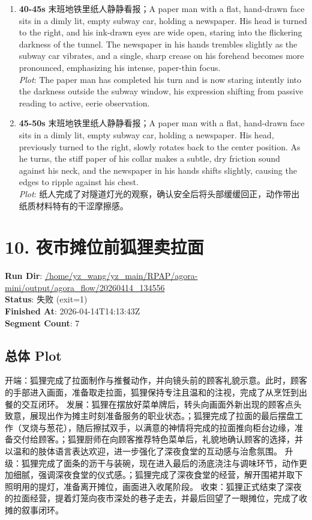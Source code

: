 \documentclass[11pt,a4paper]{article}
\begin{document}
\begin{enumerate}
\item \textbf{40-45s} 末班地铁里纸人静静看报；A paper man with a flat, hand-drawn face sits in a dimly lit, empty subway car, holding a newspaper. His head is turned to the right, and his ink-drawn eyes are wide open, staring into the flickering darkness of the tunnel. The newspaper in his hands trembles slightly as the subway car vibrates, and a single, sharp crease on his forehead becomes more pronounced, emphasizing his intense, paper-thin focus.\\\newline \textit{Plot}: The paper man has completed his turn and is now staring intently into the darkness outside the subway window, his expression shifting from passive reading to active, eerie observation.
\item \textbf{45-50s} 末班地铁里纸人静静看报；A paper man with a flat, hand-drawn face sits in a dimly lit, empty subway car, holding a newspaper. His head, previously turned to the right, slowly rotates back to the center position. As he turns, the stiff paper of his collar makes a subtle, dry friction sound against his neck, and the newspaper in his hands shifts slightly, causing the edges to ripple against his chest.\\\newline \textit{Plot}: 纸人完成了对隧道灯光的观察，确认安全后将头部缓缓回正，动作带出纸质材料特有的干涩摩擦感。
\end{enumerate}

\section{10. 夜市摊位前狐狸卖拉面}
\textbf{Run Dir}: \url{/home/yz\_wang/yz\_main/RPAP/agora-mini/output/agora\_flow/20260414\_134556}\\
\textbf{Status}: 失败 (exit=1)\\
\textbf{Finished At}: 2026-04-14T14:13:43Z\\
\textbf{Segment Count}: 7

\subsection*{总体 Plot}
开端：狐狸完成了拉面制作与推餐动作，并向镜头前的顾客礼貌示意。此时，顾客的手部进入画面，准备取走拉面，狐狸保持专注且温和的注视，完成了从烹饪到出餐的交互闭环。 发展：狐狸在摆放好菜单牌后，转头向画面外新出现的顾客点头致意，展现出作为摊主时刻准备服务的职业状态。；狐狸完成了拉面的最后摆盘工作（叉烧与葱花），随后擦拭双手，以满意的神情将完成的拉面推向柜台边缘，准备交付给顾客。；狐狸厨师在向顾客推荐特色菜单后，礼貌地确认顾客的选择，并以温和的肢体语言表达欢迎，进一步强化了深夜食堂的互动感与治愈氛围。 升级：狐狸完成了面条的沥干与装碗，现在进入最后的汤底浇注与调味环节，动作更加细腻，强调深夜食堂的仪式感。；狐狸完成了深夜食堂的经营，解开围裙并取下照明用的提灯，准备离开摊位，画面进入收尾阶段。 收束：狐狸正式结束了深夜的拉面经营，提着灯笼向夜市深处的巷子走去，并最后回望了一眼摊位，完成了收摊的叙事闭环。
\end{document}

